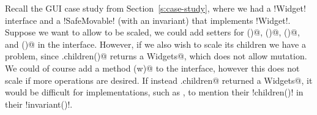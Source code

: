Recall the GUI case study from Section~\ref{s:case-study}, where we had a \Q!Widget! interface and a \Q!SafeMovable! (with an invariant) that implements \Q!Widget!.
Suppose we want to allow \Q@Widget@s to be scaled, we could add \Q@mut@ setters for \Q@width()@, \Q@height()@, \Q@left()@, and \Q@top()@ in the \Q@Widget@ interface. However, if we also wish to scale its children we have a problem, since \Q@Widget.children()@ returns a \Q@read Widgets@, which does not allow mutation. We could of course add a \Q@mut@ method \Q@zoom(w)@ to the \Q@Widget@ interface, however this does not scale if more operations are desired. If instead \Q@Widget.children@ returned a \Q@mut Widgets@, it would be difficult for \Q@Widget@ implementations, such as \Q@SafeMovable@, 
to mention their \Q!children()! in their \Q!invariant()!.


